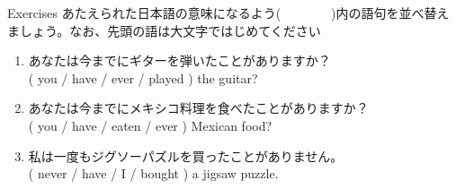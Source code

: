 \documentclass[aspectratio=169,xcolor={dvipsnames,table}]{beamer}
\newcommand{\myaudio}[1]{\href{#1}{\faVolumeUp}}
\begin{document}
\begin{frame}[plain]{Exercises}
あたえられた日本語の意味になるよう(~~~~~~~~)内の語句を並べ替えましょう。なお、先頭の語は大文字ではじめてください\mbox{}\hfill{\scriptsize \myaudio{./audio/013_have_pp_keiken_05.mp3}}

\vspace{-10pt}
 \begin{enumerate}
  \item あなたは今までにギターを弾いたことがありますか？\\
( you / have / ever / played ) the guitar?\\
\vspace{-10pt}
  \item あなたは今までにメキシコ料理を食べたことがありますか？\hfill{}\,\,\\
( you / have / eaten / ever ) Mexican food?\\
  \item 私は一度もジグソーパズルを買ったことがありません。\\
( never / have / I / bought ) a jigsaw puzzle.\\
 \end{enumerate}

\vspace{-65pt}

\mbox{}\hfill{}
\end{frame}
\end{document}
